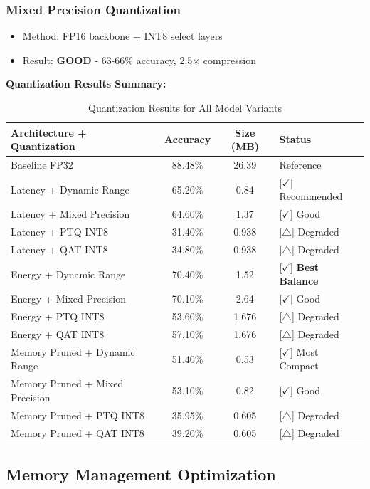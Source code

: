 \documentclass[10pt, a4paper]{article}
\begin{document}
\subsubsection{Mixed Precision Quantization}
\begin{itemize}
    \item Method: FP16 backbone + INT8 select layers
    \item Result: \textbf{GOOD} - 63-66\% accuracy, 2.5× compression
\end{itemize}

\textbf{Quantization Results Summary:}

\begin{table}[H]
\centering
\scriptsize
\begin{tabular}{|l|c|c|l|}
\hline
\textbf{Architecture + Quantization} & \textbf{Accuracy} & \textbf{Size (MB)} & \textbf{Status} \\
\hline
Baseline FP32 & 88.48\% & 26.39 & Reference \\
Latency + Dynamic Range & 65.20\% & 0.84 & [$\checkmark$] Recommended \\
Latency + Mixed Precision & 64.60\% & 1.37 & [$\checkmark$] Good \\
Latency + PTQ INT8 & 31.40\% & 0.938 & [$\triangle$] Degraded \\
Latency + QAT INT8 & 34.80\% & 0.938 & [$\triangle$] Degraded \\
Energy + Dynamic Range & 70.40\% & 1.52 & [$\checkmark$] \textbf{Best Balance} \\
Energy + Mixed Precision & 70.10\% & 2.64 & [$\checkmark$] Good \\
Energy + PTQ INT8 & 53.60\% & 1.676 & [$\triangle$] Degraded \\
Energy + QAT INT8 & 57.10\% & 1.676 & [$\triangle$] Degraded \\
Memory Pruned + Dynamic Range & 51.40\% & 0.53 & [$\checkmark$] Most Compact \\
Memory Pruned + Mixed Precision & 53.10\% & 0.82 & [$\checkmark$] Good \\
Memory Pruned + PTQ INT8 & 35.95\% & 0.605 & [$\triangle$] Degraded \\
Memory Pruned + QAT INT8 & 39.20\% & 0.605 & [$\triangle$] Degraded \\
\hline
\end{tabular}
\caption{Quantization Results for All Model Variants}
\end{table}

\subsection{Memory Management Optimization}
\end{document}
